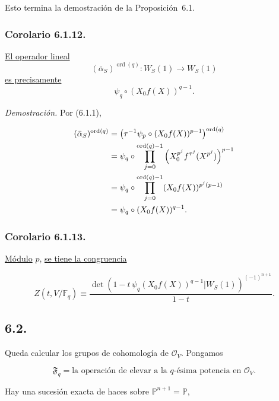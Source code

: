 Esto termina la demostración de la Proposición~6.1.

\subsubsection*{Corolario 6.1.12.}
\underline{El operador lineal}
\[
(\bar\alpha_S)^{\operatorname{ord}(q)}:W_S(1)\longrightarrow W_S(1)
\]
\underline{es precisamente}
\[
\psi_q\circ(X_0f(X))^{q-1}.
\]

\pageoriginale

\noindent\emph{Demostración.}
Por (6.1.1),

\begin{equation*}
\begin{aligned}
(\bar\alpha_S)^{\operatorname{ord}(q)}
&=
\left(
\tau^{-1}\psi_p\circ(X_0f(X))^{p-1}
\right)^{\operatorname{ord}(q)}\\
&=
\sisi{\psi_q}{\psi_q\circ}
\prod_{j=0}^{\sisi{\operatorname{ord}(a)}{\operatorname{ord}(q)}-1}
\left(X_0^{p^j}f^{\tau^j}(X^{p^j})\right)^{p-1}\\
&=
\sisi{\psi_q}{\psi_q\circ}
\prod_{j=0}^{\operatorname{ord}(q)-1}
(X_0f(X))^{p^j(p-1)}\\
&=\psi_q\circ(X_0f(X))^{q-1}.
\end{aligned}
\end{equation*}

\subsubsection*{Corolario 6.1.13.}
\underline{Módulo} $p$, \underline{se tiene la congruencia}

\begin{equation*}
Z(t,V/\mathbb F_q)
\equiv
\frac{
\det\!\left(
1-t\,\psi_q(X_0f(X))^{q-1}
\mathrel{\Big|}W_S(1)
\right)^{(-1)^{n+1}}
}{1-t}.
\end{equation*}

\subsection*{6.2.}
Queda calcular los grupos de cohomología de $\mathcal O_V$. Pongamos

\begin{equation}\tag{6.2.1}
\mathfrak F_q
=\text{la operación de elevar a la $q$-ésima potencia en $\mathcal O_V$}.
\end{equation}

Hay una sucesión exacta de haces sobre
$\mathbb P^{n+1}=\mathbb P$,

